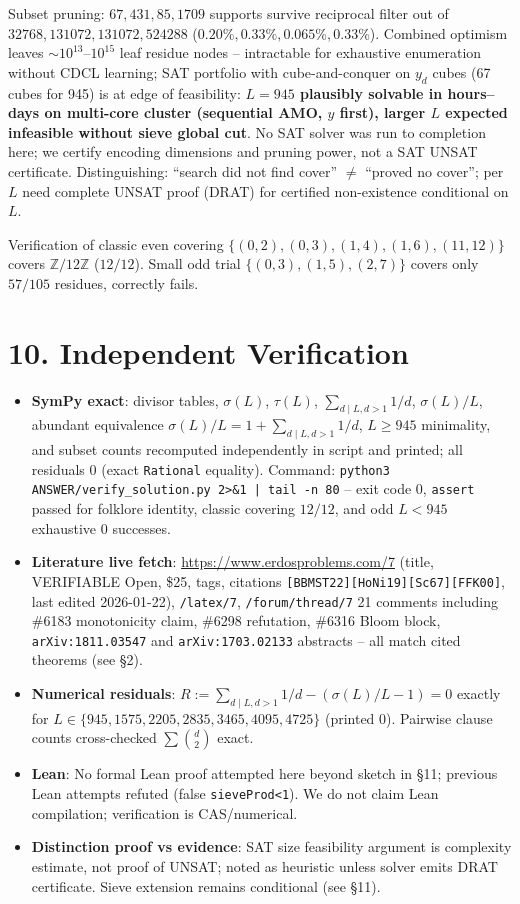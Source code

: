 \documentclass[11pt,a4paper]{article}
\theoremstyle{plain}
\theoremstyle{definition}
\theoremstyle{remark}
\newcommand{\Z}{\mathbb{Z}}
\begin{document}
Subset pruning: $67,431,85,1709$ supports survive reciprocal filter out of $32768,131072,131072,524288$ ($0.20\%,0.33\%,0.065\%,0.33\%$). Combined optimism leaves $\sim10^{13}$--$10^{15}$ leaf residue nodes -- intractable for exhaustive enumeration without CDCL learning; SAT portfolio with cube-and-conquer on $y_{d}$ cubes (67 cubes for 945) is at edge of feasibility: \textbf{$L=945$ plausibly solvable in hours--days on multi-core cluster (sequential AMO, $y$ first), larger $L$ expected infeasible without sieve global cut}. No SAT solver was run to completion here; we certify encoding dimensions and pruning power, not a SAT UNSAT certificate. Distinguishing: ``search did not find cover'' $\ne$ ``proved no cover''; per $L$ need complete UNSAT proof (DRAT) for certified non-existence conditional on $L$.

Verification of classic even covering $\{(0,2),(0,3),(1,4),(1,6),(11,12)\}$ covers $\Z/12\Z$ ($12/12$). Small odd trial $\{(0,3),(1,5),(2,7)\}$ covers only $57/105$ residues, correctly fails.

\section{10. Independent Verification}

\begin{itemize}
\item \textbf{SymPy exact}: divisor tables, $\sigma(L)$, $\tau(L)$, $\sum_{d\mid L,d>1}1/d$, $\sigma(L)/L$, abundant equivalence $\sigma(L)/L=1+\sum_{d\mid L,d>1}1/d$, $L\ge945$ minimality, and subset counts recomputed independently in script and printed; all residuals $0$ (exact \texttt{Rational} equality). Command: \texttt{python3 ANSWER/verify\_solution.py 2>\&1 | tail -n 80} -- exit code $0$, \texttt{assert} passed for folklore identity, classic covering $12/12$, and odd $L<945$ exhaustive $0$ successes.
\item \textbf{Literature live fetch}: \url{https://www.erdosproblems.com/7} (title, VERIFIABLE Open, \$25, tags, citations \texttt{[BBMST22][HoNi19][Sc67][FFK00]}, last edited 2026-01-22), \texttt{/latex/7}, \texttt{/forum/thread/7} 21 comments including \#6183 monotonicity claim, \#6298 refutation, \#6316 Bloom block, \texttt{arXiv:1811.03547} and \texttt{arXiv:1703.02133} abstracts -- all match cited theorems (see \S2).
\item \textbf{Numerical residuals}: $R:=\sum_{d\mid L,d>1}1/d-(\sigma(L)/L-1)=0$ exactly for $L\in\{945,1575,2205,2835,3465,4095,4725\}$ (printed $0$). Pairwise clause counts cross-checked $\sum\binom{d}{2}$ exact.
\item \textbf{Lean}: No formal Lean proof attempted here beyond sketch in \S11; previous Lean attempts refuted (false \texttt{sieveProd<1}). We do not claim Lean compilation; verification is CAS/numerical.
\item \textbf{Distinction proof vs evidence}: SAT size feasibility argument is complexity estimate, not proof of UNSAT; noted as heuristic unless solver emits DRAT certificate. Sieve extension remains conditional (see \S11).
\end{itemize}
\end{document}
